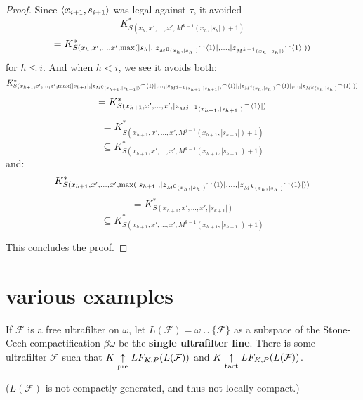 \begin{proof}
Since $\langle x_{i+1},s_{i+1}\rangle$ was legal against $\tau$, it avoided
  \[
    K^*_{S(x_h,x',\dots,x',M^{k-1}(x_h,|s_h|)+1)} 
  \]
  \[
    = 
    K^*_{S(x_h,x',\dots,x',\max(|s_h|,|{z_{M^{0}(x_h,|s_h|)}}^\frown\langle1\rangle|,\dots,|{z_{M^{k-1}(x_h,|s_h|)}}^\frown\langle1\rangle|))}
  \]
for $h\leq i$. And when $h<i$, we see it avoids both:
  \[
    K^*_{S(x_{h+1},x',\dots,x',\max(|s_{h+1}|,|{z_{M^0(x_{h+1},|s_{h+1}|)}}^\frown\langle1\rangle|,\dots,|{z_{M^{j-1}(x_{h+1},|s_{h+1}|)}}^\frown\langle1\rangle|,|{z_{M^{j}(x_{h},|s_{h}|)}}^\frown\langle1\rangle|,\dots,|{z_{M^{k}(x_{h},|s_{h}|)}}^\frown\langle1\rangle|))} 
  \]
  \[
    =
    K^*_{S(x_{h+1},x',\dots,x',|{z_{M^{j-1}(x_{h+1},|s_{h+1}|)}}^\frown\langle1\rangle|)}
  \]
  \[
    =
    K^*_{S(x_{h+1},x',\dots,x',M^{j-1}(x_{h+1},|s_{h+1}|)+1)}
  \]
  \[
    \subseteq
    K^*_{S(x_{h+1},x',\dots,x',M^{k-1}(x_{h+1},|s_{h+1}|)+1)}
  \]
and:
  \[
    K^*_{S(x_{h+1},x',\dots,x',\max(|s_{h+1}|,|{z_{M^0(x_{h},|s_{h}|)}}^\frown\langle1\rangle|,\dots,|{z_{M^{k}(x_{h},|s_{h}|)}}^\frown\langle1\rangle|))} 
  \]
  \[
    =
    K^*_{S(x_{h+1},x',\dots,x',|s_{k+1}|)}
  \]
  \[
    \subseteq
    K^*_{S(x_{h+1},x',\dots,x',M^{k-1}(x_{h+1},|s_{h+1}|)+1)}
  \]


This concludes the proof.
\end{proof}




\section{various examples}

\begin{example}
If $\mathcal{F}$ is a free ultrafilter on $\omega$, let $L(\mathcal{F})=\omega \cup \{\mathcal{F}\}$ as a subspace of the Stone-Cech compactification $\beta\omega$ be the \textbf{single ultrafilter line}. There is some ultrafilter $\mathcal{F}$ such that $K \underset{\text{pre}}{\uparrow} LF_{K,P}(L(\mathcal{F}))$ and $K \underset{\text{tact}}{\uparrow} LF_{K,P}(L(\mathcal{F}))$.

($L(\mathcal{F})$ is not compactly generated, and thus not locally compact.)
\end{example}

